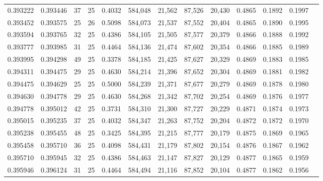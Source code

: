 \begin{tabular}{rrrrrrrrrrrrr}
0.393222 & 0.393446 &    37 &  25 &                                     0.4032 & 584,048 &  21,562 &  87,526 &  20,430 & 0.4865 & 0.1892 & 0.1997 \\
0.393452 & 0.393575 &    25 &  26 &                                     0.5098 & 584,073 &  21,537 &  87,552 &  20,404 & 0.4865 & 0.1890 & 0.1995 \\
0.393594 & 0.393765 &    32 &  25 &                                     0.4386 & 584,105 &  21,505 &  87,577 &  20,379 & 0.4866 & 0.1888 & 0.1992 \\
0.393777 & 0.393985 &    31 &  25 &                                     0.4464 & 584,136 &  21,474 &  87,602 &  20,354 & 0.4866 & 0.1885 & 0.1989 \\
0.393995 & 0.394298 &    49 &  25 &                                     0.3378 & 584,185 &  21,425 &  87,627 &  20,329 & 0.4869 & 0.1883 & 0.1985 \\
0.394311 & 0.394475 &    29 &  25 &                                     0.4630 & 584,214 &  21,396 &  87,652 &  20,304 & 0.4869 & 0.1881 & 0.1982 \\
0.394475 & 0.394629 &    25 &  25 &                                     0.5000 & 584,239 &  21,371 &  87,677 &  20,279 & 0.4869 & 0.1878 & 0.1980 \\
0.394630 & 0.394778 &    29 &  25 &                                     0.4630 & 584,268 &  21,342 &  87,702 &  20,254 & 0.4869 & 0.1876 & 0.1977 \\
0.394778 & 0.395012 &    42 &  25 &                                     0.3731 & 584,310 &  21,300 &  87,727 &  20,229 & 0.4871 & 0.1874 & 0.1973 \\
0.395015 & 0.395235 &    37 &  25 &                                     0.4032 & 584,347 &  21,263 &  87,752 &  20,204 & 0.4872 & 0.1872 & 0.1970 \\
0.395238 & 0.395455 &    48 &  25 &                                     0.3425 & 584,395 &  21,215 &  87,777 &  20,179 & 0.4875 & 0.1869 & 0.1965 \\
0.395458 & 0.395710 &    36 &  25 &                                     0.4098 & 584,431 &  21,179 &  87,802 &  20,154 & 0.4876 & 0.1867 & 0.1962 \\
0.395710 & 0.395945 &    32 &  25 &                                     0.4386 & 584,463 &  21,147 &  87,827 &  20,129 & 0.4877 & 0.1865 & 0.1959 \\
0.395946 & 0.396124 &    31 &  25 &                                     0.4464 & 584,494 &  21,116 &  87,852 &  20,104 & 0.4877 & 0.1862 & 0.1956 \\

\end{tabular}
